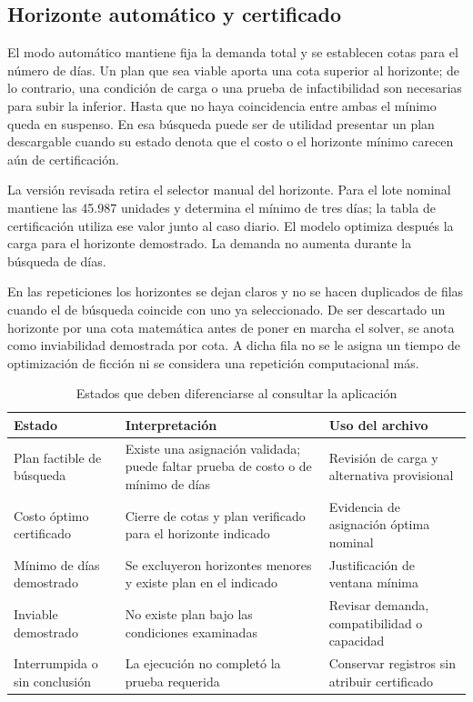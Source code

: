 \subsection{Horizonte automático y certificado}
El modo automático mantiene fija la demanda total y se establecen cotas para el número de días. Un plan que sea viable aporta una cota superior al horizonte; de lo contrario, una condición de carga o una prueba de infactibilidad son necesarias para subir la inferior. Hasta que no haya coincidencia entre ambas el mínimo queda en suspenso. En esa búsqueda puede ser de utilidad presentar un plan descargable cuando su estado denota que el costo o el horizonte mínimo carecen aún de certificación.

La versión revisada retira el selector manual del horizonte. Para el lote nominal mantiene las 45.987 unidades y determina el mínimo de tres días; la tabla de certificación utiliza ese valor junto al caso diario. El modelo optimiza después la carga para el horizonte demostrado. La demanda no aumenta durante la búsqueda de días.

En las repeticiones los horizontes se dejan claros y no se hacen duplicados de filas cuando el de búsqueda coincide con uno ya seleccionado. De ser descartado un horizonte por una cota matemática antes de poner en marcha el solver, se anota como inviabilidad demostrada por cota. A dicha fila no se le asigna un tiempo de optimización de ficción ni se considera una repetición computacional más.

\begin{table}[H]\centering\small
\caption{Estados que deben diferenciarse al consultar la aplicación}
\begin{tabular}{p{43mm}p{56mm}p{46mm}}\toprule
Estado & Interpretación & Uso del archivo\\\midrule
Plan factible de búsqueda & Existe una asignación validada; puede faltar prueba de costo o de mínimo de días & Revisión de carga y alternativa provisional\\
Costo óptimo certificado & Cierre de cotas y plan verificado para el horizonte indicado & Evidencia de asignación óptima nominal\\
Mínimo de días demostrado & Se excluyeron horizontes menores y existe plan en el indicado & Justificación de ventana mínima\\
Inviable demostrado & No existe plan bajo las condiciones examinadas & Revisar demanda, compatibilidad o capacidad\\
Interrumpida o sin conclusión & La ejecución no completó la prueba requerida & Conservar registros sin atribuir certificado\\\bottomrule
\end{tabular}
\end{table}

